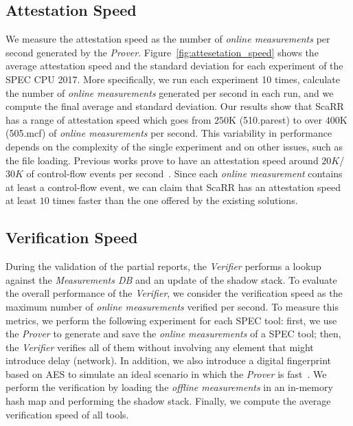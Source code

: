 \subsection{Attestation Speed}
\label{ssec:attestation-speed}
We measure the attestation speed as the number of \emph{online measurements} 
per second generated by the \emph{Prover}. 
Figure~\ref{fig:attesetation_speed} shows the average attestation speed and the 
standard deviation for each experiment of the SPEC CPU 2017. 
More specifically, we run each experiment 10 times, calculate the number of 
\emph{online measurements} generated per second in each run, and we compute the 
final average and standard deviation. 
Our results show that ScaRR has a range of attestation speed which goes from 
$250$K (510.parest) to over $400$K (505.mcf) of \emph{online measurements} per 
second. This variability in performance depends on the complexity of the single 
experiment and on other issues, such as the file loading. Previous works prove 
to have an attestation speed around $20K$/ $30K$ of control-flow events per 
second~\citep{aberadiat,abera2016c}. Since each \emph{online measurement} 
contains at least a control-flow event, we can claim that ScaRR has an 
attestation speed at least $10$ times faster than the one offered by the 
existing solutions.


\subsection{Verification Speed}
\label{ssec:verification-speed}
During the validation of the partial reports, the \emph{Verifier} performs a 
lookup against the \emph{Measurements DB} and an update of the shadow stack. 
To evaluate the overall performance of the \emph{Verifier}, we consider the 
verification speed as the maximum number of \emph{online measurements} verified 
per second. 
To measure this metrics, we perform the following experiment for each SPEC tool:
first, we use the \emph{Prover} to generate and save the \emph{online 
measurements} of a SPEC tool; 
then, the \emph{Verifier} verifies all of them without involving any element 
that might introduce delay (\eg network). 
In addition, we also introduce a digital fingerprint based on 
AES to simulate an ideal scenario in which the \emph{Prover} is 
fast~\citep{Stallings:2002:AES:763194.763196}. 
We perform the verification by loading the \emph{offline measurements} in an 
in-memory hash map and performing the shadow stack.
Finally, we compute the average verification speed of all tools.

